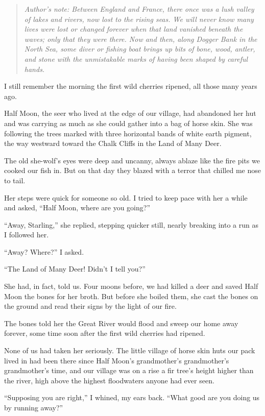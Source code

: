 \begin{quote}
  \emph{Author's note: Between England and France, there once was a lush valley of lakes and rivers, now lost to the rising seas. We will never know many lives were lost or changed forever when that land vanished beneath the waves; only that they were there. Now and then, along Dogger Bank in the North Sea, some diver or fishing boat brings up bits of bone, wood, antler, and stone with the unmistakable marks of having been shaped by careful hands.}
\end{quote}

\noindent I still remember the morning the first wild cherries ripened, all those many years ago.

Half Moon, the seer who lived at the edge of our village, had abandoned her hut and was carrying as much as she could gather into a bag of horse skin. She was following the trees marked with three horizontal bands of white earth pigment, the way westward toward the Chalk Cliffs in the Land of Many Deer.

The old she-wolf's eyes were deep and uncanny, always ablaze like the fire pits we cooked our fish in. But on that day they blazed with a terror that chilled me nose to tail.

Her steps were quick for someone so old. I tried to keep pace with her a while and asked, ``Half Moon, where are you going?''

``Away, Starling,'' she replied, stepping quicker still, nearly breaking into a run as I followed her.

``Away? Where?'' I asked.

``The Land of Many Deer! Didn't I tell you?''

She had, in fact, told us. Four moons before, we had killed a deer and saved Half Moon the bones for her broth. But before she boiled them, she cast the bones on the ground and read their signs by the light of our fire.

The bones told her the Great River would flood and sweep our home away forever, some time soon after the first wild cherries had ripened.

None of us had taken her seriously. The little village of horse skin huts our pack lived in had been there since Half Moon's grandmother's grandmother's grandmother's time, and our village was on a rise a fir tree's height higher than the river, high above the highest floodwaters anyone had ever seen.

``Supposing you are right,'' I whined, my ears back. ``What good are you doing us by running away?''

